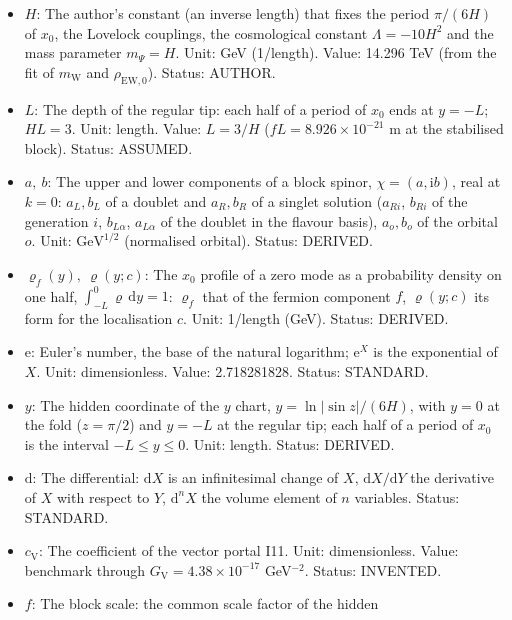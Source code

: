\documentclass[
  10pt,
]{article}
\begin{document}
\begin{itemize}
\item
  \(H\): The author's constant (an inverse length) that fixes the period
  \(\pi/(6H)\) of \(x_0\), the Lovelock couplings, the cosmological
  constant \(\Lambda = -10H^2\) and the mass parameter \(m_\Psi = H\).
  Unit: GeV (1/length). Value: 14.296 TeV (from the fit of
  \(m_{\mathrm{W}}\) and \(\rho_{\mathrm{EW},0}\)). Status: AUTHOR.
\item
  \(L\): The depth of the regular tip: each half of a period of \(x_0\)
  ends at \(y = -L\); \(HL = 3\). Unit: length. Value: \(L = 3/H\)
  (\(fL = 8.926\times10^{-21}\) m at the stabilised block). Status:
  ASSUMED.
\item
  \(a,\ b\): The upper and lower components of a block spinor,
  \(\chi = (a, \mathrm{i}b)\), real at \(k = 0\): \(a_L, b_L\) of a
  doublet and \(a_R, b_R\) of a singlet solution (\(a_{Ri}\), \(b_{Ri}\)
  of the generation \(i\), \(b_{L\alpha}\), \(a_{L\alpha}\) of the
  doublet in the flavour basis), \(a_o, b_o\) of the orbital \(o\).
  Unit: \(\mathrm{GeV}^{1/2}\) (normalised orbital). Status: DERIVED.
\item
  \(\varrho_f(y),\ \varrho(y; c)\): The \(x_0\) profile of a zero mode
  as a probability density on one half,
  \(\int_{-L}^{0}\varrho\,\mathrm{d}y = 1\): \(\varrho_f\) that of the
  fermion component \(f\), \(\varrho(y; c)\) its form for the
  localisation \(c\). Unit: 1/length (GeV). Status: DERIVED.
\item
  \(\mathrm{e}\): Euler's number, the base of the natural logarithm;
  \(\mathrm{e}^{X}\) is the exponential of \(X\). Unit: dimensionless.
  Value: 2.718281828. Status: STANDARD.
\item
  \(y\): The hidden coordinate of the \(y\) chart,
  \(y = \ln\lvert\sin z\rvert/(6H)\), with \(y = 0\) at the fold
  (\(z = \pi/2\)) and \(y = -L\) at the regular tip; each half of a
  period of \(x_0\) is the interval \(-L \le y \le 0\). Unit: length.
  Status: DERIVED.
\item
  \(\mathrm{d}\): The differential: \(\mathrm{d}X\) is an infinitesimal
  change of \(X\), \(\mathrm{d}X/\mathrm{d}Y\) the derivative of \(X\)
  with respect to \(Y\), \(\mathrm{d}^nX\) the volume element of \(n\)
  variables. Status: STANDARD.
\item
  \(c_{\mathrm{V}}\): The coefficient of the vector portal I11. Unit:
  dimensionless. Value: benchmark through
  \(G_{\mathrm{V}} = 4.38\times10^{-17}\) GeV\(^{-2}\). Status:
  INVENTED.
\item
  \(f\): The block scale: the common scale factor of the hidden

\end{itemize}
\end{document}
